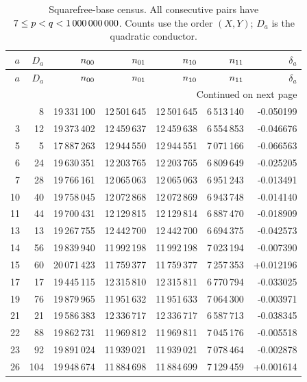 \begin{longtable}{r r r r r r r}
\caption{Squarefree-base census. All consecutive pairs have $7\le p<q<1\,000\,000\,000$. Counts use the order $(X,Y)$; $D_a$ is the quadratic conductor.}\label{tab:census}\\
\toprule $a$ & $D_a$ & $n_{00}$ & $n_{01}$ & $n_{10}$ & $n_{11}$ & $\delta_a$\\\midrule\endfirsthead
\toprule $a$ & $D_a$ & $n_{00}$ & $n_{01}$ & $n_{10}$ & $n_{11}$ & $\delta_a$\\\midrule\endhead
\midrule\multicolumn{7}{r}{Continued on next page}\\\endfoot
\bottomrule\endlastfoot
2 & 8 & 19\,331\,100 & 12\,501\,645 & 12\,501\,645 & 6\,513\,140 & -0.050199\\
3 & 12 & 19\,373\,402 & 12\,459\,637 & 12\,459\,638 & 6\,554\,853 & -0.046676\\
5 & 5 & 17\,887\,263 & 12\,944\,550 & 12\,944\,551 & 7\,071\,166 & -0.066563\\
6 & 24 & 19\,630\,351 & 12\,203\,765 & 12\,203\,765 & 6\,809\,649 & -0.025205\\
7 & 28 & 19\,766\,161 & 12\,065\,063 & 12\,065\,063 & 6\,951\,243 & -0.013491\\
10 & 40 & 19\,758\,045 & 12\,072\,868 & 12\,072\,869 & 6\,943\,748 & -0.014140\\
11 & 44 & 19\,700\,431 & 12\,129\,815 & 12\,129\,814 & 6\,887\,470 & -0.018909\\
13 & 13 & 19\,267\,755 & 12\,442\,700 & 12\,442\,700 & 6\,694\,375 & -0.042573\\
14 & 56 & 19\,839\,940 & 11\,992\,198 & 11\,992\,198 & 7\,023\,194 & -0.007390\\
15 & 60 & 20\,071\,423 & 11\,759\,377 & 11\,759\,377 & 7\,257\,353 & +0.012196\\
17 & 17 & 19\,445\,115 & 12\,315\,810 & 12\,315\,811 & 6\,770\,794 & -0.033025\\
19 & 76 & 19\,879\,965 & 11\,951\,632 & 11\,951\,633 & 7\,064\,300 & -0.003971\\
21 & 21 & 19\,586\,383 & 12\,336\,717 & 12\,336\,717 & 6\,587\,713 & -0.038345\\
22 & 88 & 19\,862\,731 & 11\,969\,812 & 11\,969\,811 & 7\,045\,176 & -0.005518\\
23 & 92 & 19\,891\,024 & 11\,939\,021 & 11\,939\,021 & 7\,078\,464 & -0.002878\\
26 & 104 & 19\,948\,674 & 11\,884\,698 & 11\,884\,699 & 7\,129\,459 & +0.001614\\

\end{longtable}
